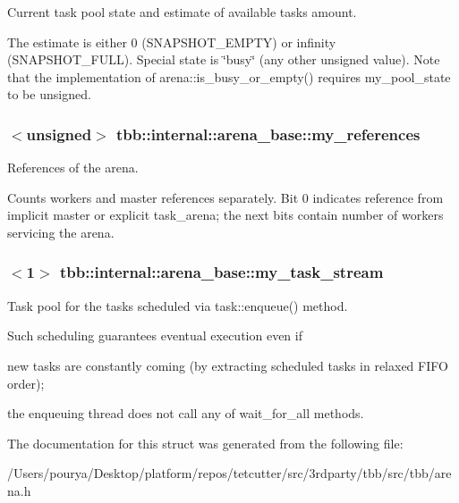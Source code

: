 Current task pool state and estimate of available tasks amount. 

The estimate is either 0 (S\+N\+A\+P\+S\+H\+O\+T\+\_\+\+E\+M\+P\+T\+Y) or infinity (S\+N\+A\+P\+S\+H\+O\+T\+\_\+\+F\+U\+L\+L). Special state is \char`\"{}busy\char`\"{} (any other unsigned value). Note that the implementation of arena\+::is\+\_\+busy\+\_\+or\+\_\+empty() requires my\+\_\+pool\+\_\+state to be unsigned. \hypertarget{structtbb_1_1internal_1_1arena__base_afda80ce7337049bd96b883cef6e8483e}{}
\subsubsection[{my\+\_\+references}]{$<$unsigned$>$ tbb\+::internal\+::arena\+\_\+base\+::my\+\_\+references}\label{structtbb_1_1internal_1_1arena__base_afda80ce7337049bd96b883cef6e8483e}


References of the arena. 

Counts workers and master references separately. Bit 0 indicates reference from implicit master or explicit task\+\_\+arena; the next bits contain number of workers servicing the arena. \hypertarget{structtbb_1_1internal_1_1arena__base_a2aefd9085b89be7e4c31820197697358}{}
\subsubsection[{my\+\_\+task\+\_\+stream}]{$<$1$>$ tbb\+::internal\+::arena\+\_\+base\+::my\+\_\+task\+\_\+stream}\label{structtbb_1_1internal_1_1arena__base_a2aefd9085b89be7e4c31820197697358}


Task pool for the tasks scheduled via task\+::enqueue() method. 

Such scheduling guarantees eventual execution even if
\begin{DoxyItemize}
\item new tasks are constantly coming (by extracting scheduled tasks in relaxed F\+I\+F\+O order);
\item the enqueuing thread does not call any of wait\+\_\+for\+\_\+all methods. 
\end{DoxyItemize}

The documentation for this struct was generated from the following file\+:\begin{DoxyCompactItemize}
\item 
/\+Users/pourya/\+Desktop/platform/repos/tetcutter/src/3rdparty/tbb/src/tbb/arena.\+h\end{DoxyCompactItemize}
